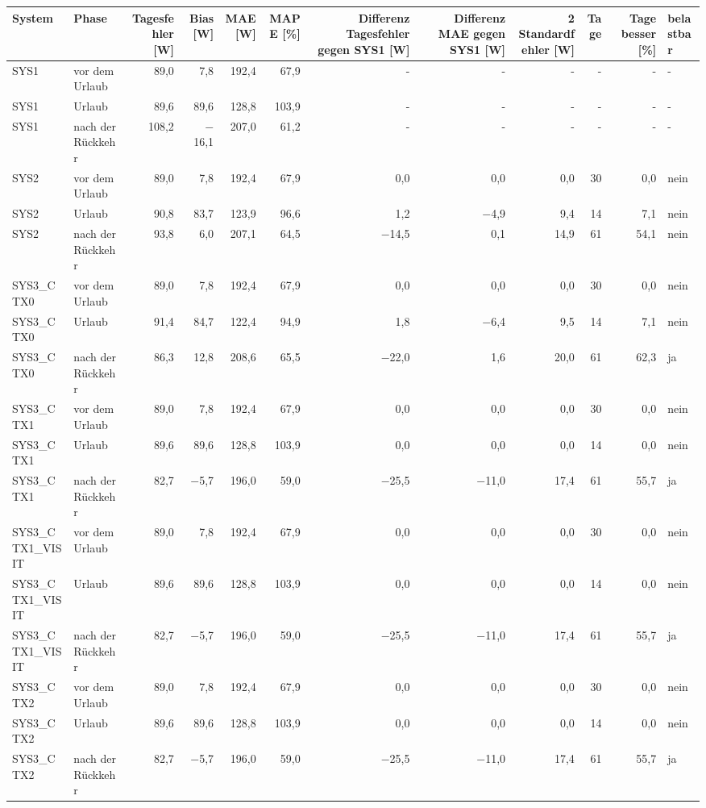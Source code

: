 \begin{tabular}{llrrrrrrrrrl}
\toprule
System & Phase & Tagesfehler [W] & Bias [W] & MAE [W] & MAPE [\%] & Differenz Tagesfehler gegen SYS1 [W] & Differenz MAE gegen SYS1 [W] & 2 Standardfehler [W] & Tage & Tage besser [\%] & belastbar \\
\midrule
SYS1 & vor dem Urlaub & 89,0 & 7,8 & 192,4 & 67,9 & - & - & - & - & - & - \\
SYS1 & Urlaub & 89,6 & 89,6 & 128,8 & 103,9 & - & - & - & - & - & - \\
SYS1 & nach der Rückkehr & 108,2 & $-$16,1 & 207,0 & 61,2 & - & - & - & - & - & - \\
SYS2 & vor dem Urlaub & 89,0 & 7,8 & 192,4 & 67,9 & 0,0 & 0,0 & 0,0 & 30 & 0,0 & nein \\
SYS2 & Urlaub & 90,8 & 83,7 & 123,9 & 96,6 & 1,2 & $-$4,9 & 9,4 & 14 & 7,1 & nein \\
SYS2 & nach der Rückkehr & 93,8 & 6,0 & 207,1 & 64,5 & $-$14,5 & 0,1 & 14,9 & 61 & 54,1 & nein \\
SYS3\_CTX0 & vor dem Urlaub & 89,0 & 7,8 & 192,4 & 67,9 & 0,0 & 0,0 & 0,0 & 30 & 0,0 & nein \\
SYS3\_CTX0 & Urlaub & 91,4 & 84,7 & 122,4 & 94,9 & 1,8 & $-$6,4 & 9,5 & 14 & 7,1 & nein \\
SYS3\_CTX0 & nach der Rückkehr & 86,3 & 12,8 & 208,6 & 65,5 & $-$22,0 & 1,6 & 20,0 & 61 & 62,3 & ja \\
SYS3\_CTX1 & vor dem Urlaub & 89,0 & 7,8 & 192,4 & 67,9 & 0,0 & 0,0 & 0,0 & 30 & 0,0 & nein \\
SYS3\_CTX1 & Urlaub & 89,6 & 89,6 & 128,8 & 103,9 & 0,0 & 0,0 & 0,0 & 14 & 0,0 & nein \\
SYS3\_CTX1 & nach der Rückkehr & 82,7 & $-$5,7 & 196,0 & 59,0 & $-$25,5 & $-$11,0 & 17,4 & 61 & 55,7 & ja \\
SYS3\_CTX1\_VISIT & vor dem Urlaub & 89,0 & 7,8 & 192,4 & 67,9 & 0,0 & 0,0 & 0,0 & 30 & 0,0 & nein \\
SYS3\_CTX1\_VISIT & Urlaub & 89,6 & 89,6 & 128,8 & 103,9 & 0,0 & 0,0 & 0,0 & 14 & 0,0 & nein \\
SYS3\_CTX1\_VISIT & nach der Rückkehr & 82,7 & $-$5,7 & 196,0 & 59,0 & $-$25,5 & $-$11,0 & 17,4 & 61 & 55,7 & ja \\
SYS3\_CTX2 & vor dem Urlaub & 89,0 & 7,8 & 192,4 & 67,9 & 0,0 & 0,0 & 0,0 & 30 & 0,0 & nein \\
SYS3\_CTX2 & Urlaub & 89,6 & 89,6 & 128,8 & 103,9 & 0,0 & 0,0 & 0,0 & 14 & 0,0 & nein \\
SYS3\_CTX2 & nach der Rückkehr & 82,7 & $-$5,7 & 196,0 & 59,0 & $-$25,5 & $-$11,0 & 17,4 & 61 & 55,7 & ja \\
\bottomrule
\end{tabular}
